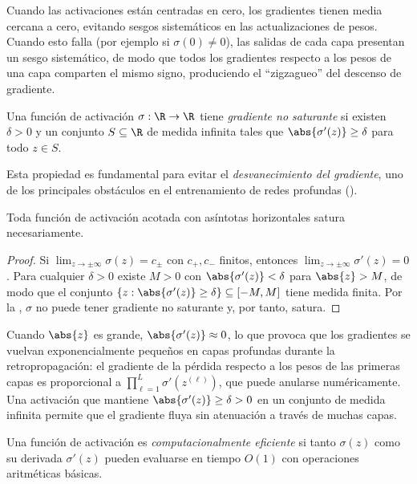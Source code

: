 Cuando las activaciones est\'an centradas en cero, los gradientes tienen media
cercana a cero, evitando sesgos sistem\'aticos en las actualizaciones de pesos.
Cuando esto falla (por ejemplo si $\sigma(0) \ne 0$), las salidas de cada capa
presentan un sesgo sistem\'atico, de modo que todos los gradientes respecto a los
pesos de una capa comparten el mismo signo, produciendo el ``zigzagueo'' del
descenso de gradiente.

\begin{definition}
\label{def:found:nonsaturating}
Una funci\'on de activaci\'on $\sigma : \R \to \R$ tiene \emph{gradiente no
saturante} si existen $\delta > 0$ y un conjunto $S \subseteq \R$ de medida
infinita tales que $\abs{\sigma'(z)} \ge \delta$ para todo $z \in S$.
\end{definition}

Esta propiedad es fundamental para evitar el \emph{desvanecimiento del gradiente},
uno de los principales obst\'aculos en el entrenamiento de redes profundas
().

\begin{corollary}
\label{cor:found:saturates}
Toda funci\'on de activaci\'on acotada con as\'intotas horizontales satura
necesariamente.
\end{corollary}

\begin{proof}
Si $\lim_{z\to\pm\infty}\sigma(z) = c_{\pm}$ con $c_+, c_-$ finitos, entonces
$\lim_{z\to\pm\infty}\sigma'(z) = 0$. Para cualquier $\delta > 0$ existe $M > 0$
con $\abs{\sigma'(z)} < \delta$ para $\abs{z} > M$, de modo que el conjunto
$\{z : \abs{\sigma'(z)} \ge \delta\} \subseteq [-M, M]$ tiene medida finita. Por
la , $\sigma$ no puede tener gradiente no saturante
y, por tanto, satura.
\end{proof}

Cuando $\abs{z}$ es grande, $\abs{\sigma'(z)} \approx 0$, lo que provoca que los
gradientes se vuelvan exponencialmente peque\~nos en capas profundas durante la
retropropagaci\'on: el gradiente de la p\'erdida respecto a los pesos de las
primeras capas es proporcional a $\prod_{\ell=1}^L \sigma'(z^{(\ell)})$, que puede
anularse num\'ericamente. Una activaci\'on que mantiene $\abs{\sigma'(z)} \ge
\delta > 0$ en un conjunto de medida infinita permite que el gradiente fluya sin
atenuaci\'on a trav\'es de muchas capas.

\begin{definition}
\label{def:found:efficiency}
Una funci\'on de activaci\'on es \emph{computacionalmente eficiente} si tanto
$\sigma(z)$ como su derivada $\sigma'(z)$ pueden evaluarse en tiempo $O(1)$ con
operaciones aritm\'eticas b\'asicas.
\end{definition}

